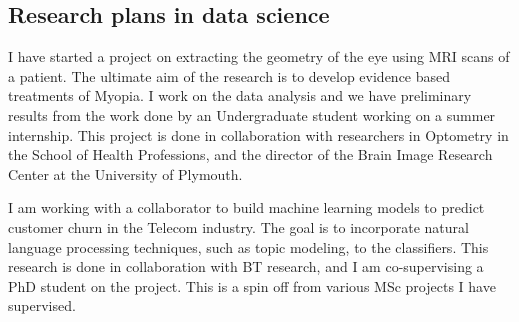 \subsection{Research plans in data science}

I have started a project on extracting the geometry of the eye using
MRI scans of a patient. The ultimate aim of the research is to develop
evidence based treatments of Myopia. I work on the data analysis and
we have preliminary results from the work done by an Undergraduate
student working on a summer internship.  This project is done in
collaboration with researchers in Optometry in the School of Health
Professions, and the director of the Brain Image Research Center at
the University of Plymouth.


I am working with a collaborator to build machine learning
models to predict customer churn in the Telecom industry.
The goal is to incorporate natural language processing techniques,
such as topic modeling, to the classifiers.
This research is done in collaboration with BT research,
and I am co-supervising a PhD student on the project.
This is a spin off from various MSc projects I have supervised.
